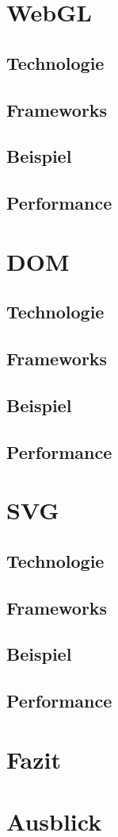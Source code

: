 \documentclass[a4paper,12pt]{article}
\begin{document}
\section{WebGL}
\subsection{Technologie}
\subsection{Frameworks}
\subsection{Beispiel}
\subsection{Performance}
\section{DOM}
\subsection{Technologie}
\subsection{Frameworks}
\subsection{Beispiel}
\subsection{Performance}
\section{SVG}
\subsection{Technologie}
\subsection{Frameworks}
\subsection{Beispiel}
\subsection{Performance}
\section{Fazit}
\section{Ausblick}
\end{document}

